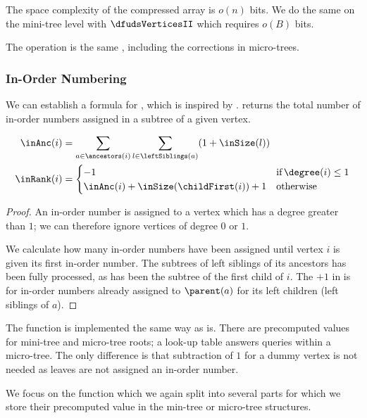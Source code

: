 The space complexity of the compressed array is $o(n)$ bits.
We do the same on the mini-tree level with $\dfudsVerticesII$ which requires $o(B)$ bits.

The operation \dfudsSelect{} is the same \preSelect{}, including the corrections in micro-trees.

\subsubsection{In-Order Numbering}

\begin{lemma}
	We can establish a formula for \inRank{}, which is inspired by \dfudsRank{}.
	\inSize{} returns the total number of in-order numbers assigned in a subtree of a given vertex.
	
	\begin{align*}
		\inAnc(i) &= \sum_{a \in \ancestors(i)} \sum_{l \in \leftSiblings(a)} (1 + \inSize(l)) \\
		\inRank(i) &= \begin{cases}
			-1 & \textif \degree(i) \le 1 \\
			\inAnc(i) + \inSize(\childFirst(i)) + 1 & \textotherwise
		\end{cases}
	\end{align*}
\end{lemma}
\begin{proof}
	An in-order number is assigned to a vertex which has a degree greater than $1$; we can therefore ignore vertices of degree $0$ or $1$.
	
	We calculate how many in-order numbers have been assigned until vertex $i$ is given its first in-order number.
	The subtrees of left siblings of its ancestors has been fully processed, as has been the subtree of the first child of $i$.
	The $+1$ in \inAnc{} is for in-order numbers already assigned to $\parent(a)$ for its left children (left siblings of $a$).
\end{proof}

The function \inSize{} is implemented the same way as \subtreeSize{} is.
There are precomputed values for mini-tree and micro-tree roots; a look-up table answers queries within a micro-tree.
The only difference is that subtraction of $1$ for a dummy vertex is not needed as leaves are not assigned an in-order number.

We focus on the function \inAnc{} which we again split into several parts for which we store their precomputed value in the min-tree or micro-tree structures.

